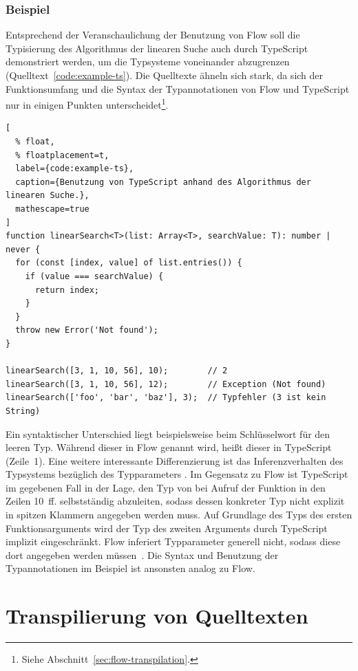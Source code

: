\subsubsection{Beispiel}

Entsprechend der Veranschaulichung der Benutzung von Flow soll die Typisierung des Algorithmus der linearen Suche auch durch TypeScript demonstriert werden, um die Typsysteme voneinander abzugrenzen (Quelltext~\ref{code:example-ts}). Die Quelltexte ähneln sich stark, da sich der Funktionsumfang und die Syntax der Typannotationen von Flow und TypeScript nur in einigen Punkten unterscheidet\footnote{Siehe Abschnitt~\ref{sec:flow-transpilation}.}.

\begin{lstlisting}[
  % float,
  % floatplacement=t,
  label={code:example-ts},
  caption={Benutzung von TypeScript anhand des Algorithmus der linearen Suche.},
  mathescape=true
]
function linearSearch<T>(list: Array<T>, searchValue: T): number | never {
  for (const [index, value] of list.entries()) {
    if (value === searchValue) {
      return index;
    }
  }
  throw new Error('Not found');
}

linearSearch([3, 1, 10, 56], 10);        // 2
linearSearch([3, 1, 10, 56], 12);        // Exception (Not found)
linearSearch(['foo', 'bar', 'baz'], 3);  // Typfehler (3 ist kein String)
\end{lstlisting}

Ein syntaktischer Unterschied liegt beispielsweise beim Schlüsselwort für den leeren Typ. Während dieser in Flow  genannt wird, heißt dieser in TypeScript  (Zeile~1). Eine weitere interessante Differenzierung ist das Inferenzverhalten des Typsystems bezüglich des Typparameters . Im Gegensatz zu Flow ist TypeScript im gegebenen Fall in der Lage, den Typ von  bei Aufruf der Funktion  in den Zeilen 10~ff. selbstständig abzuleiten, sodass dessen konkreter Typ nicht explizit in spitzen Klammern angegeben werden muss. Auf Grundlage des Typs des ersten Funktionsarguments wird der Typ des zweiten Arguments durch TypeScript implizit eingeschränkt. Flow inferiert Typparameter generell nicht, sodass diese dort angegeben werden müssen~\autocite{FLOW:GENERICS}. Die Syntax und Benutzung der Typannotationen im Beispiel ist ansonsten analog zu Flow.

\section{Transpilierung von Quelltexten}
\label{sec:transpilers}

